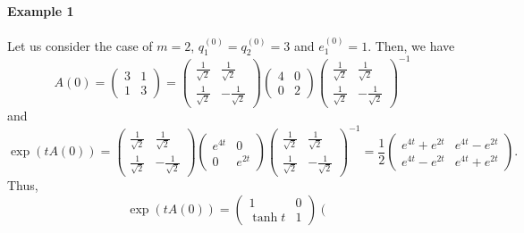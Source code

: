 \documentclass[pdflatex,sn-mathphys-num]{sn-jnl}%
\theoremstyle{thmstyleone}%
\theoremstyle{thmstyletwo}%
\theoremstyle{thmstylethree}%
\begin{document}
\begin{appendices}
\paragraph{Example 1}
Let us consider the case of $m=2$, $q_1^{(0)}=q_2^{(0)}=3$ and $e_1^{(0)}=1$. Then, we have
\begin{equation}
A(0)=\left(\begin{array}{cc}
3 & 1 \\
1 & 3
\end{array}
\right)
=\left(\begin{array}{cc}
\frac{1}{\sqrt{2}} & \frac{1}{\sqrt{2}} \\
\frac{1}{\sqrt{2}} & -\frac{1}{\sqrt{2}}
\end{array}
\right)
\left(\begin{array}{cc}
4 & 0 \\
0 & 2
\end{array}
\right)
\left(\begin{array}{cc}
\frac{1}{\sqrt{2}} & \frac{1}{\sqrt{2}} \\
\frac{1}{\sqrt{2}} & -\frac{1}{\sqrt{2}}
\end{array}
\right)^{-1}
\end{equation}
and
\begin{equation}
\exp(tA(0))= \left(\begin{array}{cc}
\frac{1}{\sqrt{2}} & \frac{1}{\sqrt{2}} \\
\frac{1}{\sqrt{2}} & -\frac{1}{\sqrt{2}}
\end{array}
\right)
\left(\begin{array}{cc}
e^{4t} & 0 \\
0 & e^{2t}
\end{array}
\right)
\left(\begin{array}{cc}
\frac{1}{\sqrt{2}} & \frac{1}{\sqrt{2}} \\
\frac{1}{\sqrt{2}} & -\frac{1}{\sqrt{2}}
\end{array}
\right)^{-1}
=\frac{1}{2}\left(\begin{array}{cc}
e^{4t}+e^{2t} & e^{4t}-e^{2t} \\
e^{4t}-e^{2t} & e^{4t}+e^{2t}
\end{array}
\right).
\end{equation}
Thus,
\begin{equation}
\exp(tA(0))
=\left(\begin{array}{cc}
1 & 0 \\
\tanh t & 1
\end{array}
\right)
\left(\begin{array}{cc}

\end{array}
\end{equation}
\end{appendices}
\end{document}
